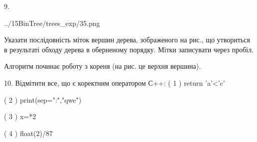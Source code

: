 \documentclass[11pt]{article}
\begin{document}
9. 

\begin{center}
	{../15BinTree/trees_exp/35.png}
\end{center}
Указати послідовність міток вершин дерева, зображеного на рис., що утвориться в результаті обходу дерева в оберненому порядку. Мітки записувати через пробіл.\par Алгоритм починає роботу з кореня (на рис. це верхня вершина).
\vspace{5mm}

10. %
Відмітити все, що є коректним оператором С++:
( 1 ) return 'a'<'c'

( 2 ) print(sep=":","qwe")

( 3 ) x=*2

( 4 ) float(2)/87
\vspace{5mm}

\newpage
\end{document}
